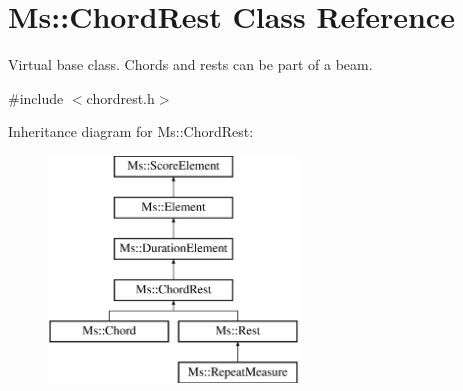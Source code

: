 \hypertarget{class_ms_1_1_chord_rest}{}\section{Ms\+:\+:Chord\+Rest Class Reference}
\label{class_ms_1_1_chord_rest}


Virtual base class. Chords and rests can be part of a beam.  




{\ttfamily \#include $<$chordrest.\+h$>$}

Inheritance diagram for Ms\+:\+:Chord\+Rest\+:\begin{figure}[H]
\begin{center}
\leavevmode
\includegraphics[height=6.000000cm]{class_ms_1_1_chord_rest}
\end{center}
\end{figure}
